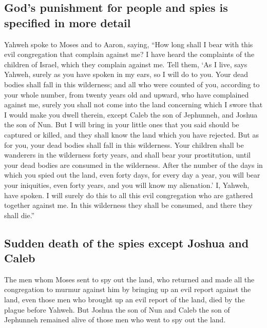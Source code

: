 \hypertarget{gods-punishment-for-people-and-spies-is-specified-in-more-detail}{%
\subsection{God's punishment for people and spies is specified in more
detail}\label{gods-punishment-for-people-and-spies-is-specified-in-more-detail}}

 Yahweh spoke to Moses and to Aaron, saying,
 ``How long shall I bear with this evil congregation that
complain against me? I have heard the complaints of the children of
Israel, which they complain against me.  Tell them, `As I
live, says Yahweh, surely as you have spoken in my ears, so I will do to
you.  Your dead bodies shall fall in this wilderness; and
all who were counted of you, according to your whole number, from twenty
years old and upward, who have complained against me, 
surely you shall not come into the land concerning which I swore that I
would make you dwell therein, except Caleb the son of Jephunneh, and
Joshua the son of Nun.  But I will bring in your little
ones that you said should be captured or killed, and they shall know the
land which you have rejected.  But as for you, your dead
bodies shall fall in this wilderness.  Your children
shall be wanderers in the wilderness forty years, and shall bear your
prostitution, until your dead bodies are consumed in the wilderness.
 After the number of the days in which you spied out the
land, even forty days, for every day a year, you will bear your
iniquities, even forty years, and you will know my alienation.'
 I, Yahweh, have spoken. I will surely do this to all
this evil congregation who are gathered together against me. In this
wilderness they shall be consumed, and there they shall die.''

\hypertarget{sudden-death-of-the-spies-except-joshua-and-caleb}{%
\subsection{Sudden death of the spies except Joshua and
Caleb}\label{sudden-death-of-the-spies-except-joshua-and-caleb}}

 The men whom Moses sent to spy out the land, who
returned and made all the congregation to murmur against him by bringing
up an evil report against the land,  even those men who
brought up an evil report of the land, died by the plague before Yahweh.
 But Joshua the son of Nun and Caleb the son of Jephunneh
remained alive of those men who went to spy out the land.

